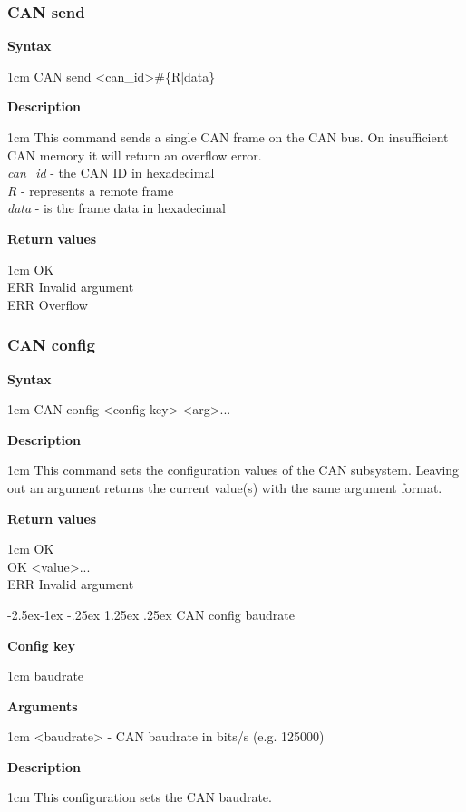 \documentclass{article}[a4paper]
\makeatletter
\newcommand\subsubsubsection{\@startsection{paragraph}{4}{\z@}%
            {-2.5ex\@plus -1ex \@minus -.25ex}%
            {1.25ex \@plus .25ex}%
            {\normalfont\normalsize\bfseries}}
\makeatother
\begin{document}
\subsubsection{CAN send}
\begin{tcolorbox}
	{\bf Syntax}

	 1cm \dimexpr\linewidth-2cm\relax
	CAN send <can\_id>\#\{R|data\}

	\medskip
	{\bf Description}

	 1cm \dimexpr\linewidth-2cm\relax
	This command sends a single CAN frame on the CAN bus. On insufficient CAN
	memory it will return an overflow error.
	\medskip \\
	{\it can\_id} - the CAN ID in hexadecimal \\
	{\it R} - represents a remote frame \\
	{\it data} - is the frame data in hexadecimal

	\medskip
	{\bf Return values}

	 1cm \dimexpr\linewidth-2cm\relax
	OK \\
	ERR Invalid argument \\
	ERR Overflow
\end{tcolorbox}

\subsubsection{CAN config}
\begin{tcolorbox}
	{\bf Syntax}

	 1cm \dimexpr\linewidth-2cm\relax
	CAN config <config key> <arg>...

	\medskip
	{\bf Description}

	 1cm \dimexpr\linewidth-2cm\relax
	This command sets the configuration values of the CAN subsystem.
	Leaving out an argument returns the current value(s) with the same argument
	format.

	\medskip
	{\bf Return values}

	 1cm \dimexpr\linewidth-2cm\relax
	OK \\
	OK <value>... \\
	ERR Invalid argument
\end{tcolorbox}

\subsubsubsection{CAN config baudrate}
\begin{tcolorbox}
	{\bf Config key}

	 1cm \dimexpr\linewidth-2cm\relax
	baudrate

	\medskip
	{\bf Arguments}

	 1cm \dimexpr\linewidth-2cm\relax
	<baudrate> - CAN baudrate in bits/s (e.g. 125000)

	\medskip
	{\bf Description}

	 1cm \dimexpr\linewidth-2cm\relax
	This configuration sets the CAN baudrate.
\end{tcolorbox}
\end{document}
